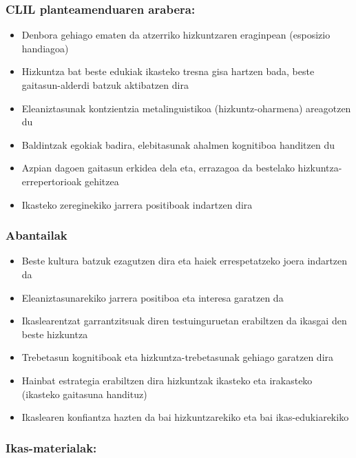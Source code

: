 \documentclass[
]{book}
\providecommand{\tightlist}{%
  \setlength{\itemsep}{0pt}\setlength{\parskip}{0pt}}
\begin{document}
\hypertarget{clil-planteamenduaren-arabera}{%
\subsubsection{CLIL planteamenduaren arabera:}\label{clil-planteamenduaren-arabera}}

\begin{itemize}
\tightlist
\item
  Denbora gehiago ematen da atzerriko hizkuntzaren eraginpean (esposizio handiagoa)
\item
  Hizkuntza bat beste edukiak ikasteko tresna gisa hartzen bada, beste gaitasun-alderdi batzuk aktibatzen dira
\item
  Eleaniztasunak kontzientzia metalinguistikoa (hizkuntz-oharmena) areagotzen du
\item
  Baldintzak egokiak badira, elebitasunak ahalmen kognitiboa handitzen du
\item
  Azpian dagoen gaitasun erkidea dela eta, errazagoa da bestelako hizkuntza-errepertorioak gehitzea
\item
  Ikasteko zereginekiko jarrera positiboak indartzen dira
\end{itemize}

\hypertarget{abantailak}{%
\subsubsection{Abantailak}\label{abantailak}}

\begin{itemize}
\tightlist
\item
  Beste kultura batzuk ezagutzen dira eta haiek errespetatzeko joera indartzen da
\item
  Eleaniztasunarekiko jarrera positiboa eta interesa garatzen da
\item
  Ikaslearentzat garrantzitsuak diren testuinguruetan erabiltzen da ikasgai den beste hizkuntza
\item
  Trebetasun kognitiboak eta hizkuntza-trebetasunak gehiago garatzen dira
\item
  Hainbat estrategia erabiltzen dira hizkuntzak ikasteko eta irakasteko (ikasteko gaitasuna handituz)
\item
  Ikaslearen konfiantza hazten da bai hizkuntzarekiko eta bai ikas-edukiarekiko
\end{itemize}

\hypertarget{ikas-materialak}{%
\subsubsection{Ikas-materialak:}\label{ikas-materialak}}
\end{document}
